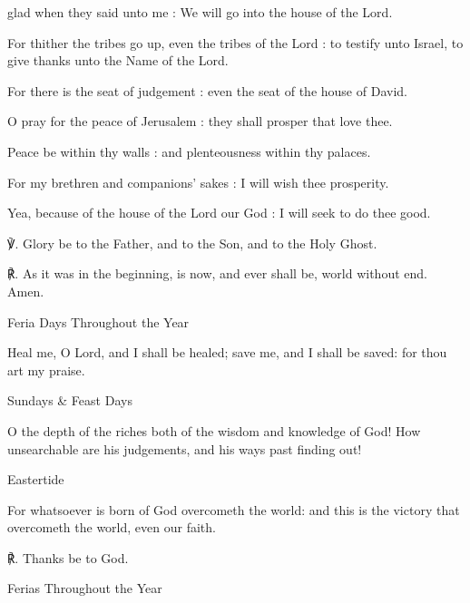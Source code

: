 \begin{multicols}{2}
 glad when they said unto me : We will go into the house of the Lord.\par
{}
For thither the tribes go up, even the tribes of the Lord : to testify unto Israel, to give thanks unto the Name of the Lord.\par
{}For there is the seat of judgement : even the seat of the house of David.\par
{}O pray for the peace of Jerusalem : they shall prosper that love thee.\par
{}Peace be within thy walls : and plenteousness within thy palaces.\par
{}For my brethren and companions' sakes : I will wish thee prosperity.\par
{}Yea, because of the house of the Lord our God : I will seek to do thee good.\par
℣. Glory be to the Father, and to the Son, and to the Holy Ghost.\par
℟. As it was in the beginning, is now, and ever shall be, world without end. Amen.

\begin{inhead}
	Feria Days Throughout the Year
\end{inhead}\par\noindent
Heal me, O Lord, and I shall be healed; save me, and I shall be saved: for thou art my praise.

\begin{inhead}
	Sundays \& Feast Days
\end{inhead}\par\noindent
O the depth of the riches both of the wisdom and knowledge of God! How unsearchable are his judgements, and his ways past finding out!

\begin{inhead}
	Eastertide
\end{inhead}\par\noindent
For whatsoever is born of God overcometh the world: and this is the victory that overcometh the world, even our faith.

℟. Thanks be to God.

\begin{inhead}
	Ferias Throughout the Year
\end{inhead}


\end{multicols}
